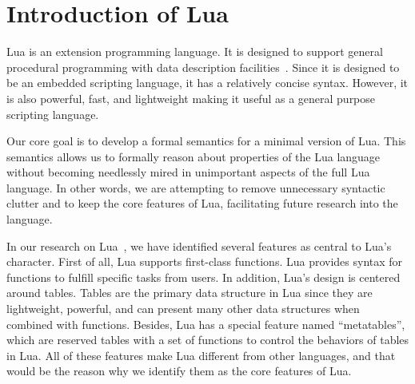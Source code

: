 \chapter{Introduction of Lua}
Lua is an extension programming language. It is designed to support general procedural programming with data description facilities~\cite{EEL}. Since it is designed to be an embedded scripting language, it has a relatively concise syntax. However, it is also powerful, fast, and lightweight making it useful as a general purpose scripting language.



Our core goal is to develop a formal semantics for a minimal version of Lua. This semantics allows us to formally reason about properties of the Lua language without becoming needlessly mired in unimportant aspects of the full Lua language. In other words, we are attempting to remove unnecessary syntactic clutter and to keep the core features of Lua, facilitating future research into the language.


In our research on Lua~\cite{LRM}, we have identified several features as central to Lua's character. First of all, Lua supports first-class functions. Lua provides syntax for functions to fulfill specific tasks from users. In addition, Lua's design is centered around tables. Tables are the primary data structure in Lua since they are lightweight, powerful, and can present many other data structures when combined with functions. Besides, Lua has a special feature named ``metatables'', which are reserved tables with a set of functions to control the behaviors of tables in Lua. All of these features make Lua different from other languages, and that would be the reason why we identify them as the core features of Lua.


